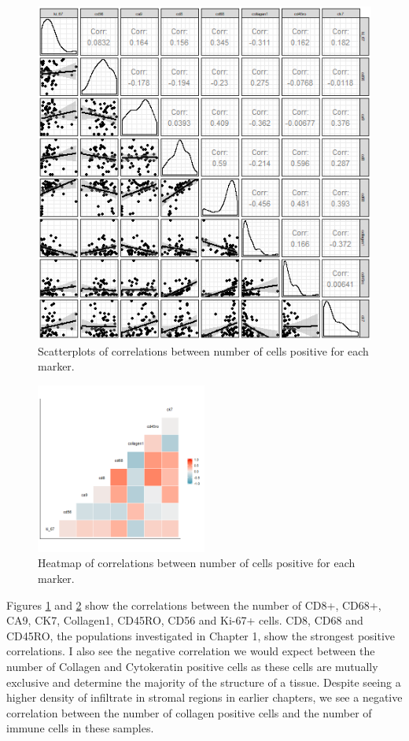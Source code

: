 \begin{figure}
    \centering
    \includegraphics{Chapter4/figs/Britroc_cell_correlation2.png}
    \caption{Scatterplots of correlations between number of cells positive for each marker.}
    \label{fig:britroc_corr_scatt}
\end{figure}

\begin{figure}
    \centering
    \includegraphics[width=0.5\textwidth]{Chapter4/figs/Britroc_cell_correlation.png}
    \caption{Heatmap of correlations between number of cells positive for each marker.}
    \label{fig:britroc_corr_heat}
\end{figure}

Figures \ref{fig:britroc_corr_scatt} and \ref{fig:britroc_corr_heat} show the correlations between the number of CD8+, CD68+, CA9, CK7, Collagen1, CD45RO, CD56 and Ki-67+ cells. CD8, CD68 and CD45RO, the populations investigated in Chapter 1, show the strongest positive correlations. I also see the negative correlation we would expect between the number of Collagen and Cytokeratin positive cells as these cells are mutually exclusive and determine the majority of the structure of a tissue. Despite seeing a higher density of infiltrate in stromal regions in earlier chapters, we see a negative correlation between the number of collagen positive cells and the number of immune cells in these samples.

